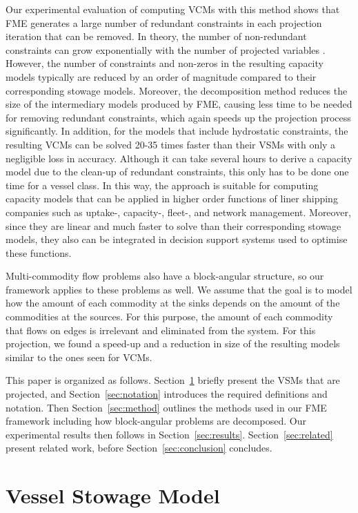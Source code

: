 \documentclass{llncs}
\begin{document}
Our experimental evaluation of computing VCMs with this method shows that FME generates a large number of redundant constraints in each projection iteration that can be removed. In theory, the number of non-redundant constraints can grow exponentially with the number of projected variables \cite{monniaux10}. However, the number of constraints and non-zeros in the resulting capacity models typically are reduced by an order of magnitude compared to their corresponding stowage models. Moreover, the decomposition method reduces the size of the intermediary models produced by FME, causing less time to be needed for removing redundant constraints, which again speeds up the projection process significantly. In addition, for the models that include hydrostatic constraints, the resulting VCMs can be solved 20-35 times faster than their VSMs with only a negligible loss in accuracy. Although it can take several hours to derive a capacity model due to the clean-up of redundant constraints, this only has to be done one time for a vessel class. In this way, the approach is suitable for computing capacity models that can be applied in higher order functions of liner shipping companies such as uptake-, capacity-, fleet-, and network management. Moreover, since they are linear and much faster to solve than their corresponding stowage models, they also can be integrated in decision support systems used to optimise these functions.

Multi-commodity flow problems also have a block-angular structure, so our framework applies to these problems as well. We assume that the goal is to model how the amount of each commodity at the sinks depends on the amount of the commodities at the sources. For this purpose, the amount of each commodity that flows on edges is irrelevant and eliminated from the system. 
For this projection, we found a speed-up and a reduction in size of the resulting models similar to the ones seen for VCMs.

This paper is organized as follows. Section~\ref{sec:model} briefly present the VSMs that are projected, and Section~\ref{sec:notation} introduces the required definitions and notation. 
Then Section~\ref{sec:method} outlines the methods used in our FME framework including how block-angular problems are decomposed. 
Our experimental results then follows in Section~\ref{sec:results}. Section~\ref{sec:related} present related work, before Section~\ref{sec:conclusion} concludes.
%
\section{Vessel Stowage Model}\label{sec:model}
\end{document}
